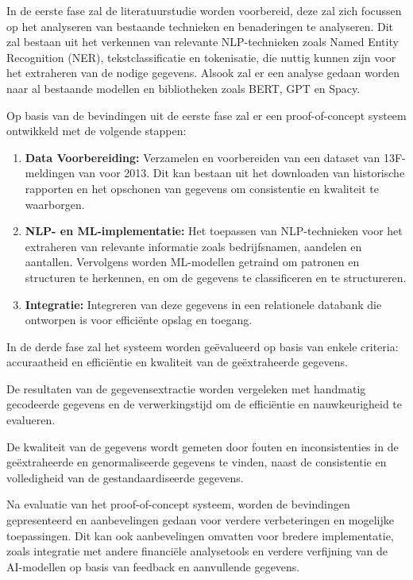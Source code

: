 In de eerste fase zal de literatuurstudie worden voorbereid, deze zal zich focussen op het analyseren van bestaande technieken en benaderingen te analyseren. Dit zal bestaan uit het verkennen van relevante NLP-technieken zoals Named Entity Recognition (NER), tekstclassificatie en tokenisatie, die nuttig kunnen zijn voor het extraheren van de nodige gegevens. Alsook zal er een analyse gedaan worden naar al bestaande modellen en bibliotheken zoals BERT, GPT en Spacy.

Op basis van de bevindingen uit de eerste fase zal er een proof-of-concept systeem ontwikkeld met de volgende stappen:
\begin{enumerate}
    \item \textbf{Data Voorbereiding:} Verzamelen en voorbereiden van een dataset van 13F- meldingen van voor 2013. Dit kan bestaan uit het downloaden van historische rapporten en het opschonen van gegevens om consistentie en kwaliteit te waarborgen.
    \item \textbf{NLP- en ML-implementatie:} Het toepassen van NLP-technieken voor het extraheren van relevante informatie zoals bedrijfsnamen, aandelen en aantallen. Vervolgens worden ML-modellen getraind om patronen en structuren te herkennen, en om de gegevens te classificeren en te structureren.
    \item \textbf{Integratie:} Integreren van deze gegevens in een relationele databank die ontworpen is voor efficiënte opslag en toegang.
\end{enumerate}

In de derde fase zal het systeem worden geëvalueerd op basis van enkele criteria: accuraatheid en efficiëntie en kwaliteit van de geëxtraheerde gegevens.

De resultaten van de gegevensextractie worden vergeleken met handmatig gecodeerde gegevens en de verwerkingstijd om de efficiëntie en nauwkeurigheid te evalueren. 

De kwaliteit van de gegevens wordt gemeten door fouten en inconsistenties in de geëxtraheerde en genormaliseerde gegevens te vinden, naast de consistentie en volledigheid van de gestandaardiseerde gegevens.


Na evaluatie van het proof-of-concept systeem, worden de bevindingen gepresenteerd en aanbevelingen gedaan voor verdere verbeteringen en mogelijke toepassingen. Dit kan ook aanbevelingen omvatten voor bredere implementatie, zoals integratie met andere financiële analysetools en verdere verfijning van de AI-modellen op basis van feedback en aanvullende gegevens.

